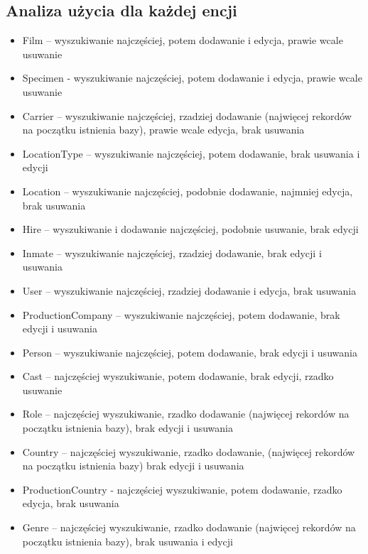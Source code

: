 \documentclass{article}
\begin{document}
\subsection{Analiza użycia dla każdej encji}
\begin{itemize}
\item Film – wyszukiwanie najczęściej, potem dodawanie i edycja, prawie wcale usuwanie
\item Specimen - wyszukiwanie najczęściej, potem dodawanie i edycja, prawie wcale usuwanie
\item Carrier – wyszukiwanie najczęściej, rzadziej dodawanie (najwięcej rekordów na początku istnienia bazy), prawie wcale edycja, brak usuwania
\item LocationType – wyszukiwanie najczęściej, potem dodawanie, brak usuwania i edycji
\item Location – wyszukiwanie najczęściej, podobnie dodawanie, najmniej edycja, brak usuwania
\item Hire – wyszukiwanie i dodawanie najczęściej, podobnie usuwanie, brak edycji
\item Inmate – wyszukiwanie najczęściej, rzadziej dodawanie, brak edycji i usuwania
\item User – wyszukiwanie najczęściej, rzadziej dodawanie i edycja, brak usuwania
\item ProductionCompany – wyszukiwanie najczęściej, potem dodawanie, brak edycji i usuwania
\item Person – wyszukiwanie najczęściej, potem dodawanie, brak edycji i usuwania
\item Cast – najczęściej wyszukiwanie, potem dodawanie, brak edycji, rzadko usuwanie
\item Role – najczęściej wyszukiwanie, rzadko dodawanie (najwięcej rekordów na początku istnienia bazy), brak edycji i usuwania
\item Country – najczęściej wyszukiwanie, rzadko dodawanie, (najwięcej rekordów na początku istnienia bazy) brak edycji i usuwania
\item ProductionCountry  - najczęściej wyszukiwanie, potem dodawanie, rzadko edycja, brak usuwania
\item Genre – najczęściej wyszukiwanie, rzadko dodawanie (najwięcej rekordów na początku istnienia bazy), brak usuwania i edycji

\end{itemize}
\end{document}
